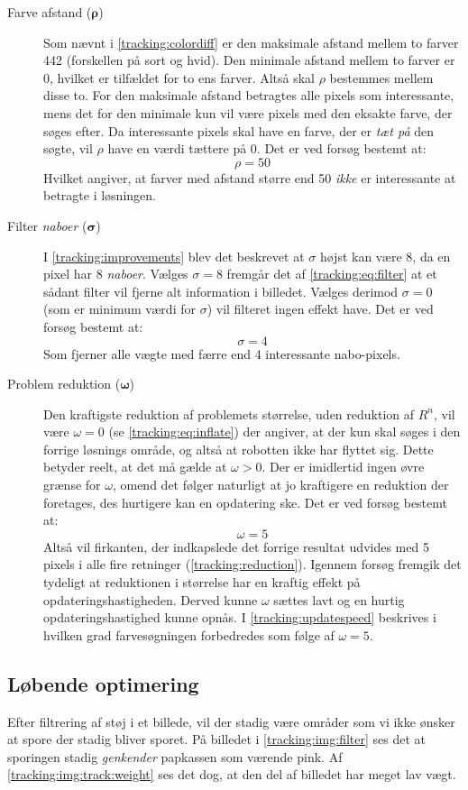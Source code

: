 \begin{description}
\item[Farve afstand (${\boldsymbol{\rho}}$)]
Som nævnt i \cref{tracking:colordiff} er den maksimale afstand mellem to farver 442 (forskellen på sort og hvid).
Den minimale afstand mellem to farver er 0, hvilket er tilfældet for to ens farver.
Altså skal $\rho$ bestemmes mellem disse to.
For den maksimale afstand betragtes alle pixels som interessante, mens det for den minimale kun vil være pixels med den eksakte farve, der søges efter.
Da interessante pixels skal have en farve, der er \emph{tæt på} den søgte, vil $\rho$ have en værdi tættere på 0.
Det er ved forsøg bestemt at:
$$\rho = 50$$
Hvilket angiver, at farver med afstand større end 50 \emph{ikke} er interessante at betragte i løsningen.

\item[Filter \textit{naboer} ($\boldsymbol{\sigma}$)]
I \cref{tracking:improvements} blev det beskrevet at $\sigma$ højst kan være 8, da en pixel har 8 \emph{naboer}.
Vælges $\sigma = 8$ fremgår det af \cref{tracking:eq:filter} at et sådant filter vil fjerne alt information i billedet.
Vælges derimod $\sigma = 0$ (som er minimum værdi for $\sigma$) vil filteret ingen effekt have.
Det er ved forsøg bestemt at:
$$\sigma = 4$$
Som fjerner alle vægte med færre end 4 interessante nabo-pixels.

\item[Problem reduktion ($\boldsymbol{\omega}$)]
Den kraftigste reduktion af problemets størrelse, uden reduktion af $R^n$, vil være $\omega = 0$ (se \cref{tracking:eq:inflate}) der angiver, at der kun skal søges i den forrige løsnings område, og altså at robotten ikke har flyttet sig.
Dette betyder reelt, at det må gælde at $\omega > 0$.
Der er imidlertid ingen øvre grænse for $\omega$, omend det følger naturligt at jo kraftigere en reduktion der foretages, des hurtigere kan en opdatering ske.
Det er ved forsøg bestemt at:
$$\omega = 5$$
Altså vil firkanten, der indkapslede det forrige resultat udvides med 5 pixels i alle fire retninger (\cref{tracking:reduction}).
Igennem forsøg fremgik det tydeligt at reduktionen i størrelse har en kraftig effekt på opdateringshastigheden.
Derved kunne $\omega$ sættes lavt og en hurtig opdateringshastighed kunne opnås.
I \cref{tracking:updatespeed} beskrives i hvilken grad farvesøgningen forbedredes som følge af $\omega = 5$.
\end{description}

\subsection{Løbende optimering}\label{tracking:optimizing}
Efter filtrering af støj i et billede, vil der stadig være områder som vi ikke ønsker at spore der stadig bliver sporet.
På billedet i \cref{tracking:img:filter} ses det at sporingen stadig \textit{genkender} papkassen som værende pink.
Af \cref{tracking:img:track:weight} ses det dog, at den del af billedet har meget lav vægt.

